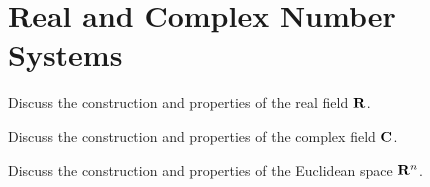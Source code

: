 \chapter{Real and Complex Number Systems}\label{chap:number-systems}

\begin{learn}
\item Discuss the construction and properties of the real field $\mathbf R$.
\item Discuss the construction and properties of the complex field $\mathbf C$.
\item Discuss the construction and properties of the Euclidean space $\mathbf R^n$.
\end{learn}

\begin{comment}
\section{Natural Numbers}
In Peano's development, it is assumed that there is a set $\NN$ (the natural numbers) of undefined objects with a distinguished element $1$ such that
\begin{enumerate}[label=(\roman*)]
\item $1$ is a natural number; that is $1\in\NN$;
\item every $n\in\NN$ has a successor $S(n)\in\NN$;
\item for every $n$, $S(n)\neq1$ (there is no number with 1 as successor)
\item if $S(n)=S(m)$, then $n=m$;
\item if $A$ is a set of natural numbers such that $1\in A$ and $n\in A\implies S(n)\in A$, then $A$ contains all natural numbers.
\end{enumerate}
These are known as \vocab{Peano's axioms}.

\begin{theorem}[Archimedean property of $\NN$]
$\NN$ is not bounded above.
\end{theorem}

\begin{proof}
Suppose, for a contradiction, that $\NN$ is bounded above. Then $\NN$ is non-empty and bounded above, so by completeness (of $\RR$) $\NN$ has a supremum.

By the Approximation property with $\epsilon=\frac{1}{2}$, there is a natural number $n\in\NN$ such that $\sup\NN-\frac{1}{2}<n\le\sup\NN$.

Now $n+1\in\NN$ and $n+1>\sup\NN$. This is a contradiction.
\end{proof}
\pagebreak


\end{comment}
